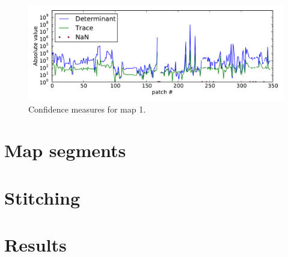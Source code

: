 \begin{figure}[ht]
  \centering
  \includegraphics[width=\textwidth]{images/experiment/map1/error-measures.pdf}
  \caption{Confidence measures for map 1.}
  \label{fig:map1-ins-problem}
\end{figure}

\section{Map segments}

\section{Stitching}

\section{Results}